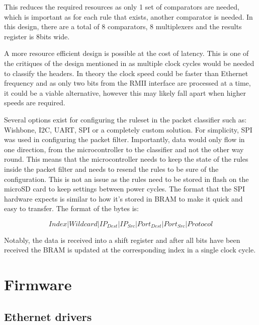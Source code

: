 This reduces the required resources as only 1 set of comparators are needed, which is important as for each rule that exists, another comparator is needed. In this design, there are a total of 8 comparators, 8 multiplexers and the results register is 8bits wide. 

A more resource efficient design is possible at the cost of latency. This is one of the critiques of the design mentioned in \cite{FastRecongifFPGAFirewall} as multiple clock cycles would be needed to classify the headers. In theory the clock speed could be faster than Ethernet frequency and as only two bits from the RMII interface are processed at a time, it could be a viable alternative, however this may likely fall apart when higher speeds are required. 


Several options exist for configuring the ruleset in the packet classifier such as: Wishbone, I2C, UART, SPI or a completely custom solution. For simplicity, SPI was used in configuring the packet filter. Importantly, data would only flow in one direction, from the microcontroller to the classifier and not the other way round. This means that the microcontroller needs to keep the state of the rules inside the packet filter and needs to resend the rules to be sure of the configuration. This is not an issue as the rules need to be stored in flash on the microSD card to keep settings between power cycles. The format that the SPI hardware expects is similar to how it's stored in BRAM to make it quick and easy to transfer. The format of the bytes is: 

\[
Index | Wildcard | IP_{Dest} |  IP_{Src}  | Port_{Dest} |  Port_{Src} | Protocol
\]


Notably, the data is received into a shift register and after all bits have been received the BRAM is updated at the corresponding index in a single clock cycle.








\section{Firmware}
\subsection{Ethernet drivers}
\label{sec:ethernet_mac_driver}

